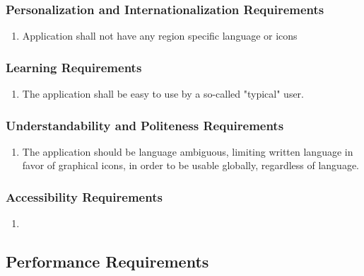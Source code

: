 \documentclass[]{article}
\begin{document}
\subsubsection{Personalization and Internationalization Requirements}
\label{ssub:personalization_and_internationalization_requirements}
\begin{enumerate}[{UH}1. ]
	\item Application shall not have any region specific language or icons
\end{enumerate}

\subsubsection{Learning Requirements}
\label{ssub:learning_requirements}
\begin{enumerate}[{UH}1. ]
	\item The application shall be easy to use by a so-called "typical" user.
\end{enumerate}

\subsubsection{Understandability and Politeness Requirements}
\label{ssub:understandability_and_politeness_requirements}
\begin{enumerate}[{UH}1. ]
	\item The application should be language ambiguous, limiting written language in favor of graphical icons, in order to be usable globally, regardless of language.
\end{enumerate}

\subsubsection{Accessibility Requirements}
\label{ssub:accessibility_requirements}
\begin{enumerate}[{UH}1. ]
	\item 
\end{enumerate}


\subsection{Performance Requirements}
\label{sub:performance_requirements}
\end{document}
